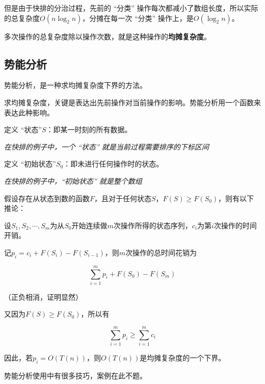 但是由于快排的分治过程，先前的 “分类” 操作每次都减小了数组长度，所以实际的总复杂度$O(n \log_2 n)$，分摊在每一次 “分类” 操作上，是$O(\log_2 n)$。

多次操作的总复杂度除以操作次数，就是这种操作的\textbf{均摊复杂度}。

\subsection{势能分析}

势能分析，是一种求均摊复杂度下界的方法。

求均摊复杂度，关键是表达出先前操作对当前操作的影响。势能分析用一个函数来表达此种影响。

定义 “状态”$S$：即某一时刻的所有数据。

{\em 在快排的例子中，一个 “状态” 就是当前过程需要排序的下标区间 }

定义 “初始状态”$S_0$：即未进行任何操作时的状态。

{\em 在快排的例子中，“初始状态” 就是整个数组 }

假设存在从状态到数的函数$F$，且对于任何状态$S$，$F(S) \geq F(S_0)$，则有以下推论：

设$S_1,S_2, \cdots ,S_m$为从$S_0$开始连续做$m$次操作所得的状态序列，$c_i$为第$i$次操作的时间开销。

记$p_i = c_i + F(S_i) - F(S_{i-1})$，则$m$次操作的总时间花销为

$$
\sum_{i=1}^m p_i + F(S_0) - F(S_m)
$$

（正负相消，证明显然）

又因为$F(S) \geq F(S_0)$，所以有

$$
\sum_{i=1}^m p_i \geq \sum_{i=1}^m c_i
$$

因此，若$p_i = O(T(n))$，则$O(T(n))$是均摊复杂度的一个下界。

势能分析使用中有很多技巧，案例在此不题。
